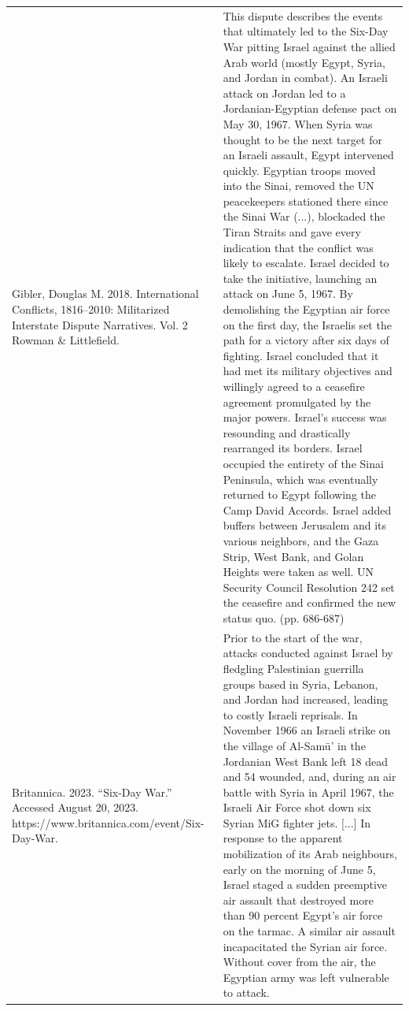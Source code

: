 {\begin{longtable}{p{}p{}}
Gibler, Douglas M. 2018. International Conflicts, 1816–2010: Militarized Interstate Dispute Narratives. Vol. 2 Rowman \& Littlefield. & This dispute describes the events that ultimately led to the Six-Day War pitting Israel against the allied Arab world (mostly Egypt, Syria, and Jordan in combat). An Israeli attack on Jordan led to a Jordanian-Egyptian defense pact on May 30, 1967. When Syria was thought to be the next target for an Israeli assault, Egypt intervened quickly. Egyptian troops moved into the Sinai, removed the UN peacekeepers stationed there since the Sinai War (...), blockaded the Tiran Straits and gave every indication that the conflict was likely to escalate. Israel decided to take the initiative, launching an attack on June 5, 1967. By demolishing the Egyptian air force on the first day, the Israelis set the path for a victory after six days of fighting. Israel concluded that it had met its military objectives and willingly agreed to a ceasefire agreement promulgated by the major powers. Israel's success was resounding and drastically rearranged its borders. Israel occupied the entirety of the Sinai Peninsula, which was eventually returned to Egypt following the Camp David Accords. Israel added buffers between Jerusalem and its various neighbors, and the Gaza Strip, West Bank, and Golan Heights were taken as well. UN Security Council Resolution 242 set the ceasefire and confirmed the new status quo. (pp. 686-687)
\\
Britannica. 2023. “Six-Day War.” Accessed August 20, 2023. https://www.britannica.com/event/Six-Day-War. & Prior to the start of the war, attacks conducted against Israel by fledgling Palestinian guerrilla groups based in Syria, Lebanon, and Jordan had increased, leading to costly Israeli reprisals. In November 1966 an Israeli strike on the village of Al-Samū' in the Jordanian West Bank left 18 dead and 54 wounded, and, during an air battle with Syria in April 1967, the Israeli Air Force shot down six Syrian MiG fighter jets. [...] In response to the apparent mobilization of its Arab neighbours, early on the morning of June 5, Israel staged a sudden preemptive air assault that destroyed more than 90 percent Egypt's air force on the tarmac. A similar air assault incapacitated the Syrian air force. Without cover from the air, the Egyptian army was left vulnerable to attack.
\\

\end{longtable}}
